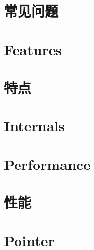 \documentclass[twoside]{book}
\newcommand{\+}{\discretionary{\mbox{\scriptsize$\hookleftarrow$}}{}{}}
\begin{document}
\chapter{常见问题}
\label{md_Cadriciel_Commun_Externe_RapidJSON_doc_faq.zh-cn}
\hypertarget{md_Cadriciel_Commun_Externe_RapidJSON_doc_faq.zh-cn}{}

\chapter{Features}
\label{md_Cadriciel_Commun_Externe_RapidJSON_doc_features}
\hypertarget{md_Cadriciel_Commun_Externe_RapidJSON_doc_features}{}

\chapter{特点}
\label{md_Cadriciel_Commun_Externe_RapidJSON_doc_features.zh-cn}
\hypertarget{md_Cadriciel_Commun_Externe_RapidJSON_doc_features.zh-cn}{}

\chapter{Internals}
\label{md_Cadriciel_Commun_Externe_RapidJSON_doc_internals}
\hypertarget{md_Cadriciel_Commun_Externe_RapidJSON_doc_internals}{}

\chapter{Performance}
\label{md_Cadriciel_Commun_Externe_RapidJSON_doc_performance}
\hypertarget{md_Cadriciel_Commun_Externe_RapidJSON_doc_performance}{}

\chapter{性能}
\label{md_Cadriciel_Commun_Externe_RapidJSON_doc_performance.zh-cn}
\hypertarget{md_Cadriciel_Commun_Externe_RapidJSON_doc_performance.zh-cn}{}

\chapter{Pointer}
\label{md_Cadriciel_Commun_Externe_RapidJSON_doc_pointer}
\hypertarget{md_Cadriciel_Commun_Externe_RapidJSON_doc_pointer}{}

\end{document}
